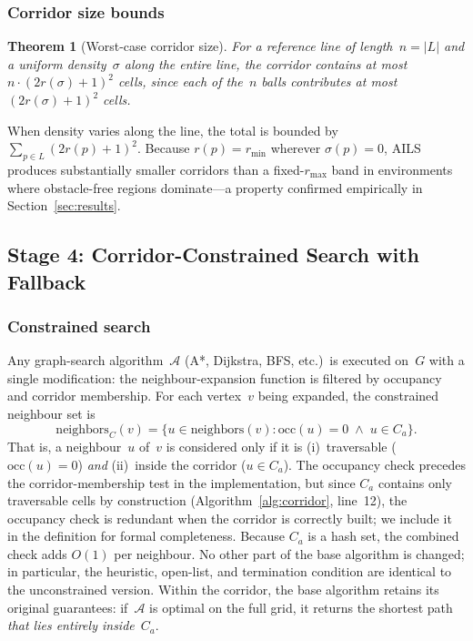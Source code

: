 \documentclass[journal]{IEEEtran}
\newtheorem{theorem}{Theorem}
\begin{document}
\subsubsection{Corridor size bounds}

\begin{theorem}[Worst-case corridor size]\label{thm:corridor_bound}
For a reference line of length~$n = |L|$ and a \emph{uniform} density~$\sigma$ along the entire line, the corridor contains at most $n \cdot (2r(\sigma) + 1)^{2}$ cells, since each of the~$n$ balls contributes at most $(2r(\sigma)+1)^{2}$ cells.
\end{theorem}

\noindent
When density varies along the line, the total is bounded by $\sum_{p\in L}(2r(p)+1)^{2}$.
Because $r(p) = r_{\min}$ wherever $\sigma(p) = 0$, AILS produces substantially smaller corridors than a fixed-$r_{\max}$ band in environments where obstacle-free regions dominate---a property confirmed empirically in Section~\ref{sec:results}.

\subsection{Stage 4: Corridor-Constrained Search with Fallback}
\label{sec:fallback}

\subsubsection{Constrained search}

Any graph-search algorithm~$\mathcal{A}$ (A*, Dijkstra, BFS, etc.)\ is executed on~$G$ with a single modification: the neighbour-expansion function is filtered by occupancy and corridor membership.
For each vertex~$v$ being expanded, the constrained neighbour set is
\begin{equation}
    \mathrm{neighbors}_{C}(v) = \{u \in \mathrm{neighbors}(v) : \mathrm{occ}(u) = 0 \;\wedge\; u \in C_a\}.
    \label{eq:neighbor_filter}
\end{equation}
That is, a neighbour~$u$ of~$v$ is considered only if it is (i)~traversable ($\mathrm{occ}(u)=0$) \emph{and} (ii)~inside the corridor ($u \in C_a$).
The occupancy check precedes the corridor-membership test in the implementation, but since $C_a$ contains only traversable cells by construction (Algorithm~\ref{alg:corridor}, line~12), the occupancy check is redundant when the corridor is correctly built; we include it in the definition for formal completeness.
Because $C_a$ is a hash set, the combined check adds $O(1)$ per neighbour.
No other part of the base algorithm is changed; in particular, the heuristic, open-list, and termination condition are identical to the unconstrained version.
Within the corridor, the base algorithm retains its original guarantees: if~$\mathcal{A}$ is optimal on the full grid, it returns the shortest path \emph{that lies entirely inside}~$C_a$.
\end{document}
